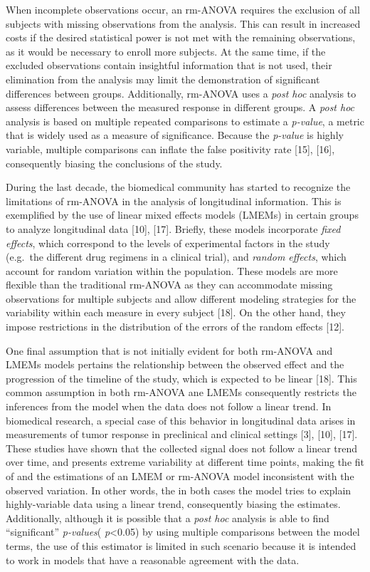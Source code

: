 \documentclass[
]{article}
\begin{document}
When incomplete observations occur, an rm-ANOVA requires the exclusion of all subjects with missing observations from the analysis. This can result in increased costs if the desired statistical power is not met with the remaining observations, as it would be necessary to enroll more subjects. At the same time, if the excluded observations contain insightful information that is not used, their elimination from the analysis may limit the demonstration of significant differences between groups. Additionally, rm-ANOVA uses a \emph{post hoc} analysis to assess differences between the measured response in different groups. A \emph{post hoc} analysis is based on multiple repeated comparisons to estimate a \emph{p-value}, a metric that is widely used as a measure of significance. Because the \emph{p-value} is highly variable, multiple comparisons can inflate the false positivity rate {[}15{]}, {[}16{]}, consequently biasing the conclusions of the study.

During the last decade, the biomedical community has started to recognize the limitations of rm-ANOVA in the analysis of longitudinal information. This is exemplified by the use of linear mixed effects models (LMEMs) in certain groups to analyze longitudinal data {[}10{]}, {[}17{]}. Briefly, these models incorporate \emph{fixed effects}, which correspond to the levels of experimental factors in the study (e.g.~the different drug regimens in a clinical trial), and \emph{random effects}, which account for random variation within the population. These models are more flexible than the traditional rm-ANOVA as they can accommodate missing observations for multiple subjects and allow different modeling strategies for the variability within each measure in every subject {[}18{]}. On the other hand, they impose restrictions in the distribution of the errors of the random effects {[}12{]}.

One final assumption that is not initially evident for both rm-ANOVA and LMEMs models pertains the relationship between the observed effect and the progression of the timeline of the study, which is expected to be linear {[}18{]}. This common assumption in both rm-ANOVA ane LMEMs consequently restricts the inferences from the model when the data does not follow a linear trend. In biomedical research, a special case of this behavior in longitudinal data arises in measurements of tumor response in preclinical and clinical settings {[}3{]}, {[}10{]}, {[}17{]}. These studies have shown that the collected signal does not follow a linear trend over time, and presents extreme variability at different time points, making the fit of and the estimations of an LMEM or rm-ANOVA model inconsistent with the observed variation. In other words, the in both cases the model tries to explain highly-variable data using a linear trend, consequently biasing the estimates. Additionally, although it is possible that a \emph{post hoc} analysis is able to find ``significant'' \emph{p-values}( \emph{p}\textless0.05) by using multiple comparisons between the model terms, the use of this estimator is limited in such scenario because it is intended to work in models that have a reasonable agreement with the data.
\end{document}
